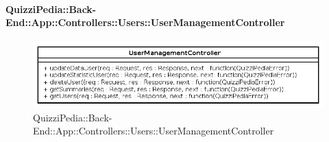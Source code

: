 \paragraph{QuizziPedia::Back-End::App::Controllers::Users::UserManagementController}
\label{QuizziPedia::Back-End::App::Controllers::Users::UserManagementController}
\begin{figure}[ht]
	\centering
	\includegraphics[scale=0.45]{UML/Classi/Back-End/QuizziPedia_Back-End_App_Controllers_Users_UserManagementController.png}
	\caption{QuizziPedia::Back-End::App::Controllers::Users::UserManagementController}
\end{figure}
\FloatBarrier
